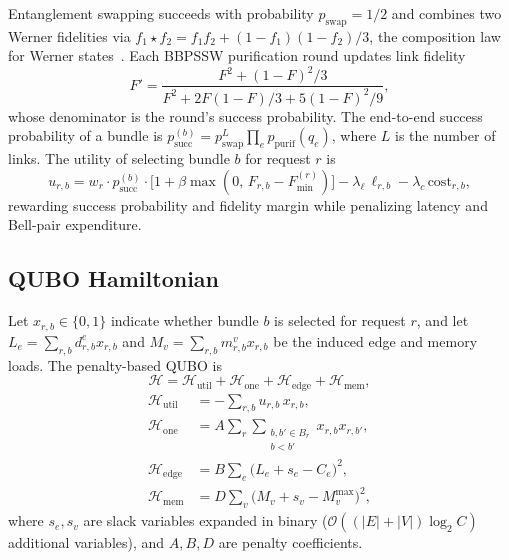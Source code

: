 \documentclass[twocolumn]{article}
\newcommand{\calH}{\mathcal{H}}
\begin{document}
Entanglement swapping succeeds with probability $p_{\text{swap}}=1/2$
and combines two Werner fidelities via
$f_1 \star f_2 = f_1 f_2 + (1-f_1)(1-f_2)/3$, the composition law for
Werner states~\cite{werner1989quantum,bennett1993teleporting,
vanmeter2014quantum}.  Each BBPSSW purification round updates link
fidelity
\begin{equation}
  F' = \frac{F^2 + (1-F)^2/3}{F^2 + 2F(1-F)/3 + 5(1-F)^2/9},
\end{equation}
whose denominator is the round's success probability.  The end-to-end
success probability of a bundle is
$p_{\text{succ}}^{(b)} = p_{\text{swap}}^{L}\prod_{e}
p_{\text{purif}}(q_e)$, where $L$ is the number of links.  The utility
of selecting bundle $b$ for request $r$ is
\begin{equation}
  \label{eq:utility}
  u_{r,b} = w_r \cdot p_{\text{succ}}^{(b)} \cdot
    \bigl[1 + \beta \max(0,\, F_{r,b} - F_{\min}^{(r)})\bigr]
    - \lambda_\ell\, \ell_{r,b}
    - \lambda_c\, \text{cost}_{r,b},
\end{equation}
rewarding success probability and fidelity margin while penalizing
latency and Bell-pair expenditure.

\subsection{QUBO Hamiltonian}
\label{sec:qubo-ham}

Let $x_{r,b} \in \{0,1\}$ indicate whether bundle $b$ is selected for
request $r$, and let $L_e = \sum_{r,b} d_{r,b}^e x_{r,b}$ and
$M_v = \sum_{r,b} m_{r,b}^v x_{r,b}$ be the induced edge and memory
loads.  The penalty-based QUBO is
\begin{equation}
  \calH = \calH_{\text{util}} + \calH_{\text{one}} + \calH_{\text{edge}} + \calH_{\text{mem}},
  \label{eq:qubo-ham}
\end{equation}
\begin{align}
  \calH_{\text{util}} &= -\sum_{r,b} u_{r,b}\, x_{r,b},\\
  \calH_{\text{one}} &= A \sum_r
    \sum_{\substack{b,b'\in B_r\\b<b'}} x_{r,b}x_{r,b'},\\
  \calH_{\text{edge}} &= B \sum_e \bigl(L_e + s_e - C_e\bigr)^2,\\
  \calH_{\text{mem}} &= D \sum_v \bigl(M_v + s_v - M_v^{\max}\bigr)^2,
\end{align}
where $s_e,s_v$ are slack variables expanded in binary
($\mathcal{O}((|E|+|V|)\log_2 C)$ additional variables), and $A,B,D$
are penalty coefficients.
\end{document}

